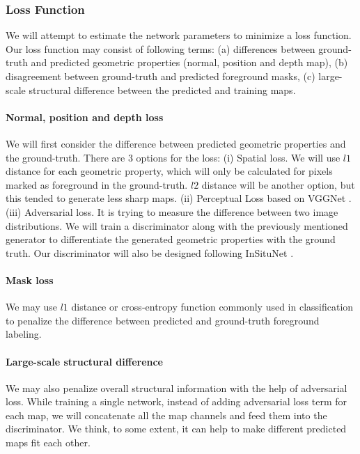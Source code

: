 \documentclass[journal]{vgtc}                %
\begin{document}
\subsubsection{Loss Function}
We will attempt to estimate the network parameters to minimize a loss function. Our loss function may consist of following terms: (a) differences between ground-truth and predicted geometric properties (normal, position and depth map),  (b) disagreement between ground-truth and predicted foreground masks, (c) large-scale structural difference between the predicted and training maps.

\paragraph{Normal, position and depth loss}
We will first consider the difference between predicted geometric properties and the ground-truth. There are 3 options for the loss: (i) Spatial loss. We will use $l1$ distance for each geometric property, which will only be calculated for pixels marked as foreground in the ground-truth. $l2$ distance will be another option, but this tended to generate less sharp maps. (ii) Perceptual Loss based on VGGNet \cite{simonyan2014very}. (iii) Adversarial loss. It is trying to measure the difference between two image distributions. We will train a discriminator along with the previously mentioned generator to differentiate the generated geometric properties with the ground truth. Our discriminator will also be designed following InSituNet \cite{he2019insitunet}. 

\paragraph{Mask loss}
We may use $l1$ distance or cross-entropy function commonly used in classification to penalize the difference between predicted and ground-truth foreground labeling.

\paragraph{Large-scale structural difference}
We may also penalize overall structural information with the help of adversarial loss. While training a single network, instead of adding adversarial loss term for each map, we will concatenate all the map channels and feed them into the discriminator. We think, to some extent, it can help to make different predicted maps fit each other.   
\end{document}

